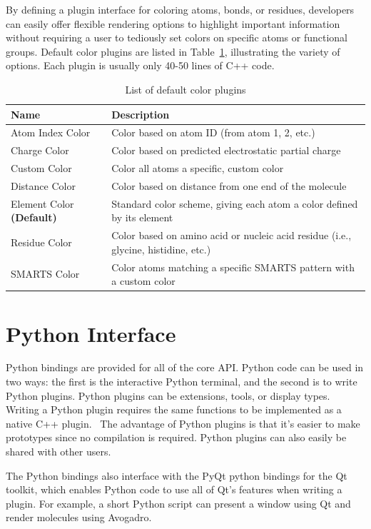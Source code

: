 \documentclass[10pt]{bmc_article}
\newenvironment{bmcformat}{\begin{raggedright}
\baselineskip20pt\sloppy\setboolean{publ}{false}}{\end{raggedright}
\baselineskip20pt\sloppy}
\begin{document}
\begin{bmcformat}
By defining a plugin interface for coloring atoms, bonds, or residues,
developers can easily offer flexible rendering options to highlight
important information without requiring a user to tediously set colors
on specific atoms or functional groups. Default color plugins are
listed in Table~\ref{color-table}, illustrating the variety of
options. Each plugin is usually only 40-50 lines of C++ code.

\begin{table}
  \caption{List of default color plugins}
  \label{color-table}
\begin{tabular}{l | l}
\hline
Name & Description \\
\hline
Atom Index Color & Color based on atom ID (from atom 1, 2, etc.) \\
Charge Color & Color based on predicted electrostatic partial charge \\
Custom Color & Color all atoms a specific, custom color \\
Distance Color & Color based on distance from one end of the
molecule \\
Element Color \textbf{(Default)} & Standard color scheme, giving each
atom a color defined by its element\\
Residue Color & Color based on amino acid or nucleic acid residue (i.e., glycine,
histidine, etc.) \\
SMARTS Color & Color atoms matching a specific SMARTS pattern with a
custom color \\
\hline
\end{tabular}
\end{table}

\section{Python Interface} %

Python bindings are provided for all of the core API. Python code can be used
in two ways: the first is the interactive Python terminal, and the second is to
write Python plugins. Python plugins can be extensions, tools, or display types.
Writing a Python plugin requires the same functions to be implemented as a
native C++ plugin.~\cite{PythonExtensions} The advantage of Python
plugins is that it's easier to make prototypes since no compilation is
required. Python plugins can also easily be shared with other users.

The Python bindings also interface with the PyQt python bindings for the Qt
toolkit, which enables Python code to use all of Qt's features when writing a
plugin. For example, a short Python script can present a window using Qt and
render molecules using Avogadro.~\cite{PythonWindowExample}


\end{bmcformat}
\end{document}
